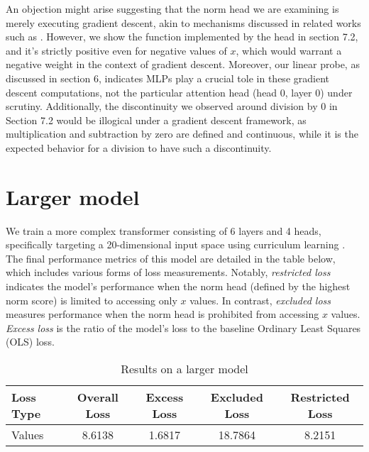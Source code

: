 \documentclass{article}
\begin{document}
An objection might arise suggesting that the norm head we are examining is merely executing gradient descent, akin to mechanisms discussed in related works such as \citep{vonoswald_2023_transformers}. However, we show the function implemented by the head in section 7.2, and it's strictly positive even for negative values of $x$, which would warrant a negative weight in the context of gradient descent. Moreover, our linear probe, as discussed in section 6, indicates MLPs play a crucial tole in these gradient descent computations, not the particular attention head (head 0, layer 0) under scrutiny.  Additionally, the discontinuity we observed around division by 0 in Section 7.2 would be illogical under a gradient descent framework, as multiplication and subtraction by zero are defined and continuous, while it is the expected behavior for a division to have such a discontinuity.

\section{Larger model}


We train a more complex transformer consisting of 6 layers and 4 heads, specifically targeting a 20-dimensional input space using curriculum learning \citep{bengio_2009_curriculum}. The final performance metrics of this model are detailed in the table below, which includes various forms of loss measurements. Notably, \textit{restricted loss} indicates the model's performance when the norm head (defined by the highest norm score) is limited to accessing only $x$ values. In contrast, \textit{excluded loss} measures performance when the norm head is prohibited from accessing $x$ values. \textit{Excess loss} is the ratio of the model's loss to the baseline Ordinary Least Squares (OLS) loss.

\begin{table}[htbp]
  \caption{Results on a larger model}
  \centering
  \begin{tabular}{lcccc} 
    \toprule
    Loss Type & Overall Loss & Excess Loss & Excluded Loss & Restricted Loss \\
    \midrule
    Values & 8.6138 & 1.6817 & 18.7864 & 8.2151 \\
    \bottomrule
  \end{tabular}
\end{table}

\newpage
\end{document}
